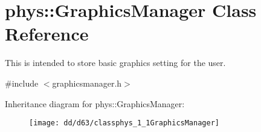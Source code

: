\hypertarget{classphys_1_1GraphicsManager}{
\section{phys::GraphicsManager Class Reference}
\label{dd/d63/classphys_1_1GraphicsManager}
}


This is intended to store basic graphics setting for the user.  




{\ttfamily \#include $<$graphicsmanager.h$>$}

Inheritance diagram for phys::GraphicsManager:\begin{figure}[H]
\begin{center}
\leavevmode
\texttt{[image: dd/d63/classphys\_1\_1GraphicsManager]}
\end{center}
\end{figure}
